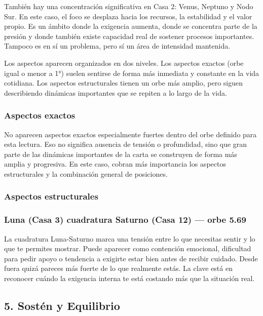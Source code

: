 \documentclass[11pt,a4paper]{article}\usepackage[utf8]{inputenc}
\begin{document}
También hay una concentración significativa en Casa 2: Venus, Neptuno y Nodo Sur. En este caso, el foco se desplaza hacia los recursos, la estabilidad y el valor propio. Es un ámbito donde la exigencia aumenta, donde se concentra parte de la presión y donde también existe capacidad real de sostener procesos importantes. Tampoco es en sí un problema, pero sí un área de intensidad mantenida.



Los aspectos aparecen organizados en dos niveles. Los aspectos exactos (orbe igual o menor a 1°) suelen sentirse de forma más inmediata y constante en la vida cotidiana. Los aspectos estructurales tienen un orbe más amplio, pero siguen describiendo dinámicas importantes que se repiten a lo largo de la vida.



\subsubsection*{Aspectos exactos}
No aparecen aspectos exactos especialmente fuertes dentro del orbe definido para esta lectura. Eso no significa ausencia de tensión o profundidad, sino que gran parte de las dinámicas importantes de la carta se construyen de forma más amplia y progresiva. En este caso, cobran más importancia los aspectos estructurales y la combinación general de posiciones.

\subsubsection*{Aspectos estructurales}
\subsubsection*{Luna (Casa 3) cuadratura Saturno (Casa 12) --- orbe 5.69\textdegree}
La cuadratura Luna-Saturno marca una tensión entre lo que necesitas sentir y lo que te permites mostrar. Puede aparecer como contención emocional, dificultad para pedir apoyo o tendencia a exigirte estar bien antes de recibir cuidado. Desde fuera quizá pareces más fuerte de lo que realmente estás. La clave está en reconocer cuándo la exigencia interna te está costando más que la situación real.



\subsection{5. Sostén y Equilibrio}
\end{document}
